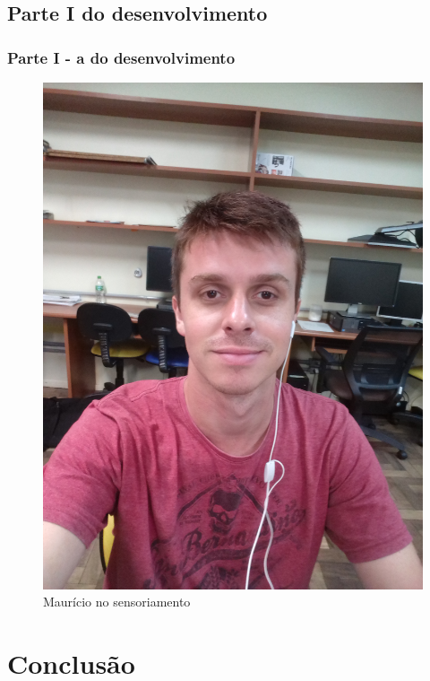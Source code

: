 \documentclass[a4paper, 12pt]{article}
\begin{document}
 \subsection{Parte I do desenvolvimento}
 \lipsum[10]
  	 
 \subsubsection{Parte I - a do desenvolvimento}
 \lipsum[10]
  	   
 \begin{figure}[htb]
   \centering
   \includegraphics[scale=0.3]{imagens/eu2.jpg}
   \caption{Maurício no sensoriamento}
   \label{rotulo-figura2}
 \end{figure}
 
 \section{Conclusão}
 \lipsum[1]
 
\end{document}
